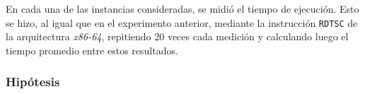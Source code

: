             En cada una de las instancias consideradas, se midió el tiempo de ejecución. Esto se hizo, al igual que en el experimento anterior, mediante la instrucción \texttt{RDTSC} de la arquitectura \emph{x86-64}, repitiendo 20 veces cada medición y calculando luego el tiempo promedio entre estos resultados.
            
        \subsubsection*{Hipótesis}


